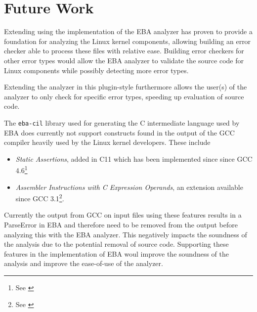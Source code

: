 \section{Future Work}

\newpar Extending using the implementation of the EBA analyzer has proven to provide a foundation for analyzing the Linux kernel components, allowing building an error checker able to process these files with relative ease. 
Building error checkers for other error types would allow the EBA analyzer to validate the source code for Linux components while possibly detecting more error types.

\newpar Extending the analyzer in this plugin-style furthermore allows the user(s) of the analyzer to only check for specific error types, speeding up evaluation of source code.

\newpar The \texttt{eba-cil} library used for generating the C intermediate language used by EBA does currently not support constructs found in the output of the GCC compiler heavily used by the Linux kernel developers. These include 
\begin{itemize}
    \item \textit{Static Assertions}, added in C11 which has been implemented since since GCC 4.6\footnote{See \cite{ISO:2011:IIIb}}
    \item \textit{Assembler Instructions with C Expression Operands}, an extension available since GCC 3.1\footnote{See \cite{GCC:3.1}}.
\end{itemize}

\noindent Currently the output from GCC on input files using these features results in a ParseError in EBA and therefore need to be removed from the output before analyzing this with the EBA analyzer. This negatively impacts the soundness of the analysis due to the potential removal of source code. Supporting these features in the implementation of EBA woul improve the soundness of the analysis and improve the ease-of-use of the analyzer. 